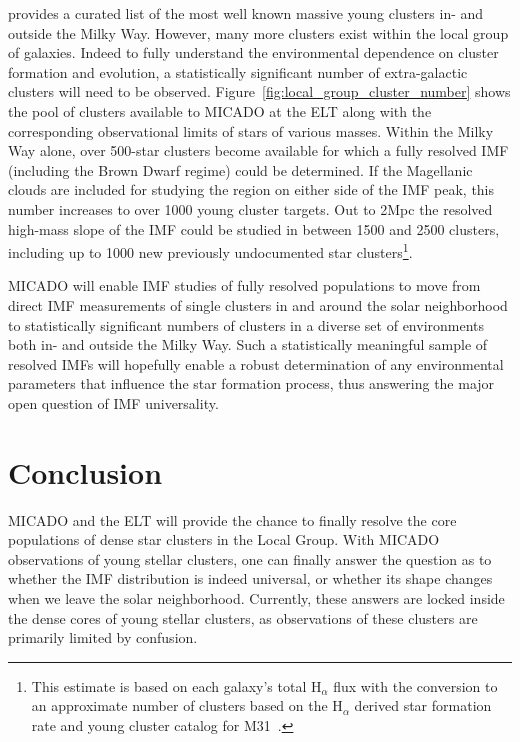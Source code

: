 \documentclass[referee]{aa}
\begin{document}
\citet{portegies2010} provides a curated list of the most well known massive young clusters in- and outside the Milky Way.
However, many more clusters exist within the local group of galaxies.
Indeed to fully understand the environmental dependence on cluster formation and evolution, a statistically significant number of extra-galactic clusters will need to be observed.
Figure~\ref{fig:local_group_cluster_number} shows the pool of clusters available to MICADO at the ELT along with the corresponding observational limits of stars of various masses.
Within the Milky Way alone, over 500-star clusters become available for which a fully resolved IMF (including the Brown Dwarf regime) could be determined.
If the Magellanic clouds are included for studying the region on either side of the IMF peak, this number increases to over 1000 young cluster targets.
Out to 2Mpc the resolved high-mass slope of the IMF could be studied in between 1500 and 2500 clusters, including up to 1000 new previously undocumented star clusters\footnote{This estimate is based on each galaxy's total H$_\alpha$ flux with the conversion to an approximate number of clusters based on the H$_\alpha$ derived star formation rate and young cluster catalog for M31~\citep{caldwell09}.}.

MICADO will enable IMF studies of fully resolved populations to move from direct IMF measurements of single clusters in and around the solar neighborhood to statistically significant numbers of clusters in a diverse set of environments both in- and outside the Milky Way.
Such a statistically meaningful sample of resolved IMFs will hopefully enable a robust determination of any environmental parameters that influence the star formation process, thus answering the major open question of IMF universality.




\section{Conclusion}
\label{sec:conclusion}

MICADO and the ELT will provide the chance to finally resolve the core populations of dense star clusters in the Local Group.
With MICADO observations of young stellar clusters, one can finally answer the question as to whether the IMF distribution is indeed universal, or whether its shape changes when we leave the solar neighborhood.
Currently, these answers are locked inside the dense cores of young stellar clusters, as observations of these clusters are primarily limited by confusion.
\end{document}

